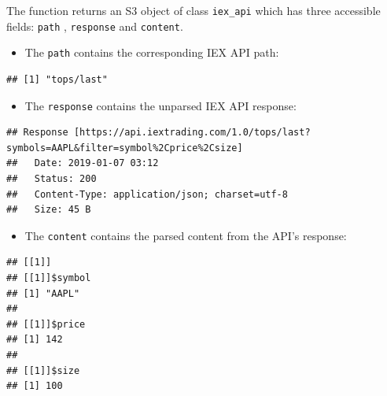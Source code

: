 \documentclass[]{book}
\newenvironment{Shaded}{\begin{snugshade}}{\end{snugshade}}
\newcommand{\OperatorTok}[1]{\textcolor[rgb]{0.81,0.36,0.00}{\textbf{#1}}}
\newcommand{\NormalTok}[1]{#1}
\providecommand{\tightlist}{%
  \setlength{\itemsep}{0pt}\setlength{\parskip}{0pt}}
\theoremstyle{definition}
\theoremstyle{definition}
\theoremstyle{definition}
\theoremstyle{remark}
\begin{document}
The function returns an S3 object of class \texttt{iex\_api} which has
three accessible fields: \texttt{path} , \texttt{response} and
\texttt{content}.

\begin{itemize}
\tightlist
\item
  The \texttt{path} contains the corresponding IEX API path:
\end{itemize}

\begin{Shaded}
\end{Shaded}

\begin{verbatim}
## [1] "tops/last"
\end{verbatim}

\begin{itemize}
\tightlist
\item
  The \texttt{response} contains the unparsed IEX API response:
\end{itemize}

\begin{Shaded}
\end{Shaded}

\begin{verbatim}
## Response [https://api.iextrading.com/1.0/tops/last?symbols=AAPL&filter=symbol%2Cprice%2Csize]
##   Date: 2019-01-07 03:12
##   Status: 200
##   Content-Type: application/json; charset=utf-8
##   Size: 45 B
\end{verbatim}

\begin{itemize}
\tightlist
\item
  The \texttt{content} contains the parsed content from the API's
  response:
\end{itemize}

\begin{Shaded}
\end{Shaded}

\begin{verbatim}
## [[1]]
## [[1]]$symbol
## [1] "AAPL"
## 
## [[1]]$price
## [1] 142
## 
## [[1]]$size
## [1] 100
\end{verbatim}
\end{document}
